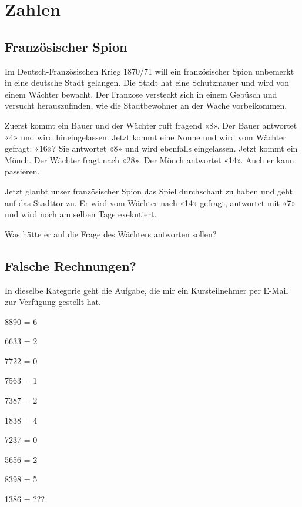 \section{Zahlen}  
\subsection{Französischer Spion}
Im Deutsch-Französischen Krieg 1870/71 will ein französischer Spion
unbemerkt in eine deutsche Stadt gelangen. Die Stadt hat eine Schutzmauer
und wird von einem Wächter bewacht. Der Franzose versteckt sich in einem
Gebüsch und versucht herauszufinden, wie die Stadtbewohner an der Wache
vorbeikommen.

Zuerst kommt ein Bauer und der Wächter ruft fragend «8». Der Bauer antwortet
«4» und wird hineingelassen. Jetzt kommt eine Nonne und wird vom Wächter
gefragt: «16»? Sie antwortet «8» und wird ebenfalls eingelassen. Jetzt kommt ein
Mönch. Der Wächter fragt nach «28». Der Mönch antwortet «14». Auch er kann
passieren.

Jetzt glaubt unser französischer Spion das Spiel durchschaut zu haben und geht
auf das Stadttor zu. Er wird vom Wächter nach «14» gefragt, antwortet mit «7»
und wird noch am selben Tage exekutiert.

Was hätte er auf die Frage des Wächters antworten sollen?

\subsection{Falsche Rechnungen?}
In dieselbe Kategorie geht die Aufgabe, die mir ein Kursteilnehmer per E-Mail
zur Verfügung gestellt hat.

8890 = 6

6633 = 2

7722 = 0 

7563 = 1

7387 = 2

1838 = 4

7237 = 0
 
5656 = 2

8398 = 5

1386 = ???

\TNTeop{}

